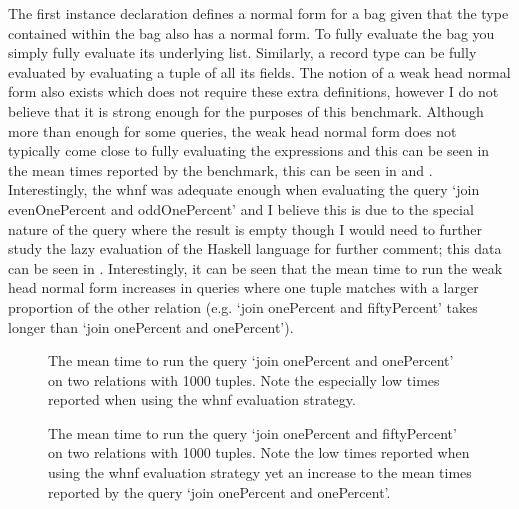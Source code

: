 \noindent
The first instance declaration defines a normal form for a bag given that the
type contained within the bag also has a normal form. To fully evaluate the bag
you simply fully evaluate its underlying list. Similarly, a record type can be
fully evaluated by evaluating a tuple of all its fields. The notion of a weak
head normal form also exists which does not require these extra definitions,
however I do not believe that it is strong enough for the purposes of this
benchmark. Although more than enough for some queries, the weak head normal form
does not typically come close to fully evaluating the expressions and this can
be seen in the mean times reported by the benchmark, this can be seen in
and . Interestingly, the whnf was
adequate enough when evaluating the query `join evenOnePercent and
oddOnePercent' and I believe this is due to the special nature of the query
where the result is empty though I would need to further study the lazy
evaluation of the Haskell language for further comment; this data can be seen in
.
Interestingly, it can be seen that the mean time to run the weak head normal
form increases in queries where one tuple matches with a larger proportion of
the other relation (e.g. `join onePercent and fiftyPercent' takes longer than
`join onePercent and onePercent'). 

\begin{figure}[p]
    \centering
    
    \caption{The mean time to run the query `join onePercent and onePercent' on
    two relations with 1000 tuples. Note the especially low times reported when
using the whnf evaluation strategy.}
    \label{fig:evaluation:nf-whnf-join-onePercent-and-onePercent}
\end{figure}

\begin{figure}[p]
    \centering
    
    \caption{The mean time to run the query `join onePercent and fiftyPercent' on
    two relations with 1000 tuples. Note the low times reported when
using the whnf evaluation strategy yet an increase to the mean times reported by
the query `join onePercent and onePercent'.}
    \label{fig:evaluation:nf-whnf-join-onePercent-and-fiftyPercent}
\end{figure}

